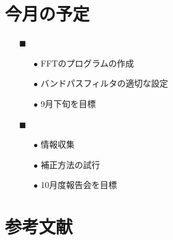 \documentclass[twocolumn,a4j]{jsarticle}
\begin{document}
\section{今月の予定}
\begin{itemize}
    \item [$\blacksquare$] 
          \begin{itemize}
              \item [$\bullet$] FFTのプログラムの作成
              \item [$\bullet$] バンドパスフィルタの適切な設定
              \item [$\bullet$] 9月下旬を目標
          \end{itemize}
    \item [$\blacksquare$] 
          \begin{itemize}
              \item [$\bullet$] 情報収集
              \item [$\bullet$] 補正方法の試行
              \item [$\bullet$] 10月度報告会を目標
          \end{itemize}
\end{itemize}

\section{参考文献}
\end{document}
